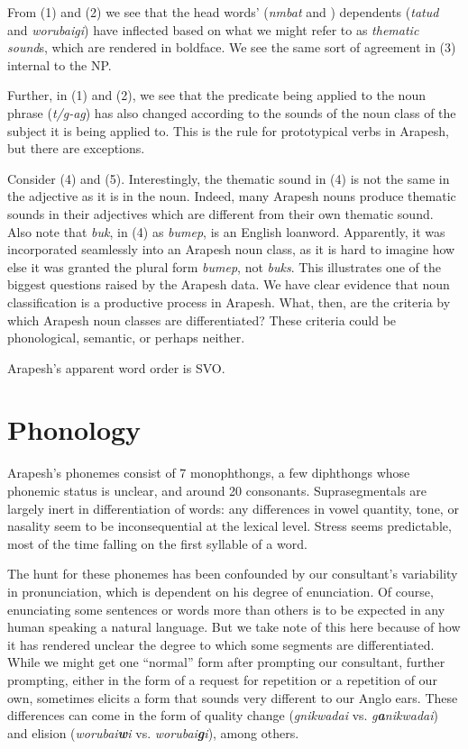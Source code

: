 \documentclass[pdftex,12pt,letterpaper]{article}
\let\ipa\textipa
\def\sw{\ipa{\super w}}
\begin{document}
\noindent From (1) and (2) we see that the head words' (\emph{n\ipa{1}mbat} and \emph{\ipa{n1mbag\sw}}) dependents (\emph{tatud} and \emph{worubaig\sw i}) have inflected based on what we might refer to as \emph{thematic sound}s, which are rendered in boldface. We see the same sort of agreement in (3) internal to the NP. 

Further, in (1) and (2), we see that the predicate being applied to the noun phrase (\emph{t/g\sw-ag\ipa{@k}}) has also changed according to the sounds of the noun class of the subject it is being applied to. This is the rule for prototypical verbs in Arapesh, but there are exceptions. 

Consider (4) and (5). Interestingly, the thematic sound in (4) is not the same in the adjective as it is in the noun. Indeed, many Arapesh nouns produce thematic sounds in their adjectives which are different from their own thematic sound. Also note that \emph{buk\sw}, in (4) as \emph{bumep}, is an English loanword. Apparently, it was incorporated seamlessly into an Arapesh noun class, as it is hard to imagine how else it was granted the plural form \emph{bumep}, not \emph{buk\sw s}. This illustrates one of the biggest questions raised by the Arapesh data. We have clear evidence that noun classification is a productive process in Arapesh. What, then, are the criteria by which Arapesh noun classes are differentiated? These criteria could be phonological, semantic, or perhaps neither.

Arapesh's apparent word order is SVO.

\section{Phonology}

Arapesh's phonemes consist of 7 monophthongs, a few diphthongs whose phonemic status is unclear, and around 20 consonants. Suprasegmentals are largely inert in differentiation of words: any differences in vowel quantity, tone, or nasality seem to be inconsequential at the lexical level. Stress seems predictable, most of the time falling on the first syllable of a word. 

The hunt for these phonemes has been confounded by our consultant's variability in pronunciation, which is dependent on his degree of enunciation. Of course, enunciating some sentences or words more than others is to be expected in any human speaking a natural language. But we take note of this here because of how it has rendered unclear the degree to which some segments are differentiated. While we might get one ``normal'' form after prompting our consultant, further prompting, either in the form of a request for repetition or a repetition of our own, sometimes elicits a form that sounds very different to our Anglo ears. These differences can come in the form of quality change (\emph{g\textbf{\ipa{@}}nikwadai} vs. \emph{g\textbf{a}nikwadai}) and elision (\emph{worubai\textbf{w}i} vs. \emph{worubai\textbf{g\sw}i}), among others. 
\end{document}
